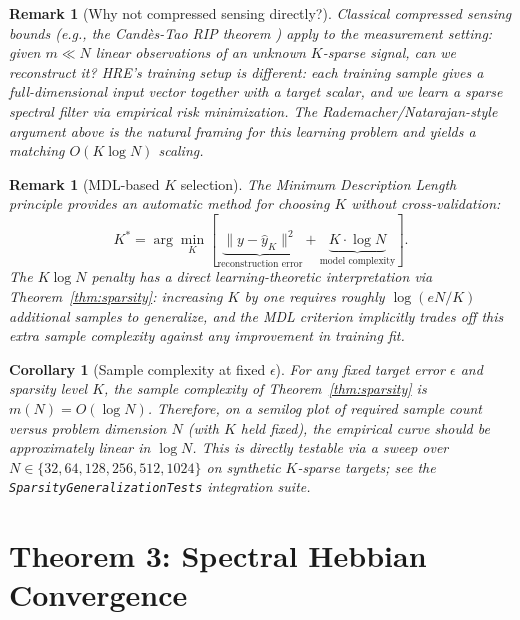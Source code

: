 \documentclass[11pt]{article}
\newtheorem{corollary}[theorem]{Corollary}
\newtheorem{remark}[theorem]{Remark}
\begin{document}
\begin{remark}[Why not compressed sensing directly?]
Classical compressed sensing bounds (e.g., the Cand\`es-Tao RIP theorem
\cite{candes2006}) apply to the \emph{measurement} setting: given $m \ll N$
linear observations of an unknown $K$-sparse signal, can we reconstruct it?
HRE's training setup is different: each training sample gives a
\emph{full-dimensional} input vector together with a target scalar, and we
learn a sparse spectral filter via empirical risk minimization. The
Rademacher/Natarajan-style argument above is the natural framing for this
learning problem and yields a matching $O(K \log N)$ scaling.
\end{remark}

\begin{remark}[MDL-based $K$ selection]
The Minimum Description Length principle provides an automatic method for
choosing $K$ without cross-validation:
\begin{equation}
K^* = \arg\min_K \left[ \underbrace{\|y - \hat{y}_K\|^2}_{\text{reconstruction error}}
+ \underbrace{K \cdot \log N}_{\text{model complexity}} \right].
\end{equation}
The $K \log N$ penalty has a direct learning-theoretic interpretation via
Theorem~\ref{thm:sparsity}: increasing $K$ by one requires roughly
$\log(eN/K)$ additional samples to generalize, and the MDL criterion
implicitly trades off this extra sample complexity against any improvement
in training fit.
\end{remark}

\begin{corollary}[Sample complexity at fixed $\epsilon$]
For any fixed target error $\epsilon$ and sparsity level $K$, the sample
complexity of Theorem~\ref{thm:sparsity} is $m(N) = O(\log N)$. Therefore,
on a semilog plot of required sample count versus problem dimension $N$
(with $K$ held fixed), the empirical curve should be approximately
\emph{linear} in $\log N$. This is directly testable via a sweep over
$N \in \{32, 64, 128, 256, 512, 1024\}$ on synthetic $K$-sparse targets;
see the \texttt{SparsityGeneralizationTests} integration suite.
\end{corollary}

\section{Theorem 3: Spectral Hebbian Convergence}
\end{document}
